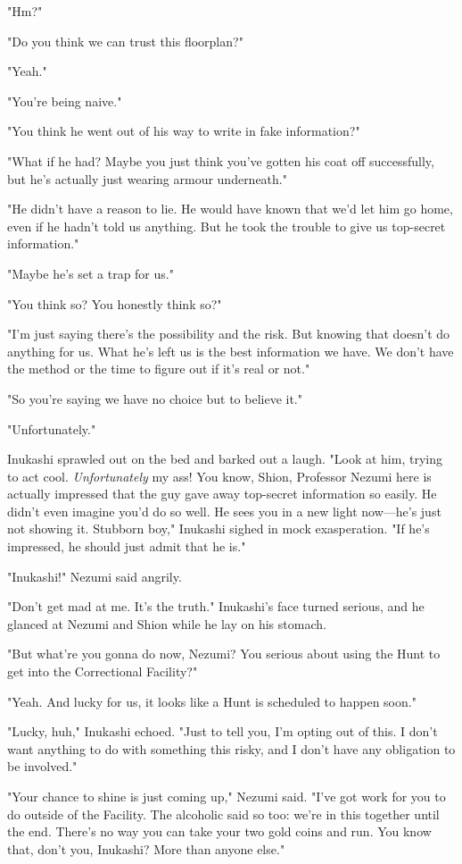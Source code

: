 "Hm?"

"Do you think we can trust this floorplan?"

"Yeah."

"You're being naive."

"You think he went out of his way to write in fake information?"

"What if he had? Maybe you just think you've gotten his coat off
successfully, but he's actually just wearing armour underneath."

"He didn't have a reason to lie. He would have known that we'd let him
go home, even if he hadn't told us anything. But he took the trouble to
give us top-secret information."

"Maybe he's set a trap for us."

"You think so? You honestly think so?"

"I'm just saying there's the possibility and the risk. But knowing that
doesn't do anything for us. What he's left us is the best information we
have. We don't have the method or the time to figure out if it's real or
not."

"So you're saying we have no choice but to believe it."

"Unfortunately."

Inukashi sprawled out on the bed and barked out a laugh. "Look at him,
trying to act cool. \emph{Unfortunately} my ass! You know, Shion, Professor
Nezumi here is actually impressed that the guy gave away top-secret
information so easily. He didn't even imagine you'd do so well. He sees
you in a new light now---he's just not showing it. Stubborn boy," Inukashi
sighed in mock exasperation. "If he's impressed, he should just admit
that he is."

"Inukashi!" Nezumi said angrily.

"Don't get mad at me. It's the truth." Inukashi's face turned serious,
and he glanced at Nezumi and Shion while he lay on his stomach.

"But what're you gonna do now, Nezumi? You serious about using the Hunt
to get into the Correctional Facility?"

"Yeah. And lucky for us, it looks like a Hunt is scheduled to happen
soon."

"Lucky, huh," Inukashi echoed. "Just to tell you, I'm opting out of
this. I don't want anything to do with something this risky, and I don't
have any obligation to be involved."

"Your chance to shine is just coming up," Nezumi said. "I've got work
for you to do outside of the Facility. The alcoholic said so too: we're
in this together until the end. There's no way you can take your two
gold coins and run. You know that, don't you, Inukashi? More than anyone
else."

